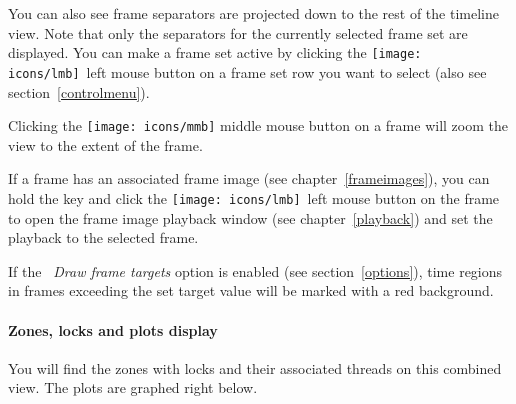 \documentclass[hidelinks,titlepage,a4paper,twoside]{article}
\newcommand{\LMB}{\texttt{[image: icons/lmb]}}
\newcommand{\MMB}{\texttt{[image: icons/mmb]}}
\begin{document}
You can also see frame separators are projected down to the rest of the timeline view. Note that only the separators for the currently selected frame set are displayed. You can make a frame set active by clicking the \LMB{}~left mouse button on a frame set row you want to select (also see section~\ref{controlmenu}).

Clicking the \MMB{} middle mouse button on a frame will zoom the view to the extent of the frame.

If a frame has an associated frame image (see chapter~\ref{frameimages}), you can hold the \keys{\ctrl} key and click the \LMB{}~left mouse button on the frame to open the frame image playback window (see chapter~\ref{playback}) and set the playback to the selected frame.

If the \emph{\faFlagCheckered{}~Draw frame targets} option is enabled (see section~\ref{options}), time regions in frames exceeding the set target value will be marked with a red background.

\paragraph{Zones, locks and plots display}
\label{zoneslocksplots}

You will find the zones with locks and their associated threads on this combined view. The plots are graphed right below.
\end{document}
